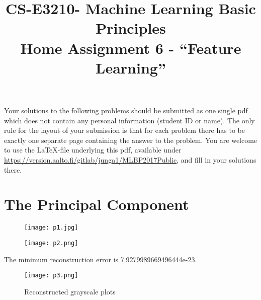 \documentclass[article,11pt]{article}
\title{CS-E3210- Machine Learning Basic Principles \\ Home Assignment 6 - ``Feature Learning''}
\begin{document}
\date{}
\maketitle

Your solutions to the following problems should be submitted as one single pdf which does not contain 
any personal information (student ID or name).  The only rule for the layout of your submission is that for each 
problem there has to be exactly one separate page containing the answer to the problem. You are welcome to use the \LaTeX-file underlying this pdf, 
available under \url{https://version.aalto.fi/gitlab/junga1/MLBP2017Public}, and fill in your solutions there. 

\newpage

\section{The Principal Component} 
\begin{figure}[H]
	\begin{center}
		\texttt{[image: p1.jpg]}
	\end{center}
\end{figure}
\begin{figure}[H]
	\begin{center}
		\texttt{[image: p2.png]}
	\end{center}
\end{figure}
The minimum reconstruction error is 7.9279989669496444e-23.
\begin{figure}[H]
	\begin{center}
		\texttt{[image: p3.png]}
	\end{center}
	\caption{Reconstructed grayscale plots}
\end{figure}

\newpage
\end{document}
